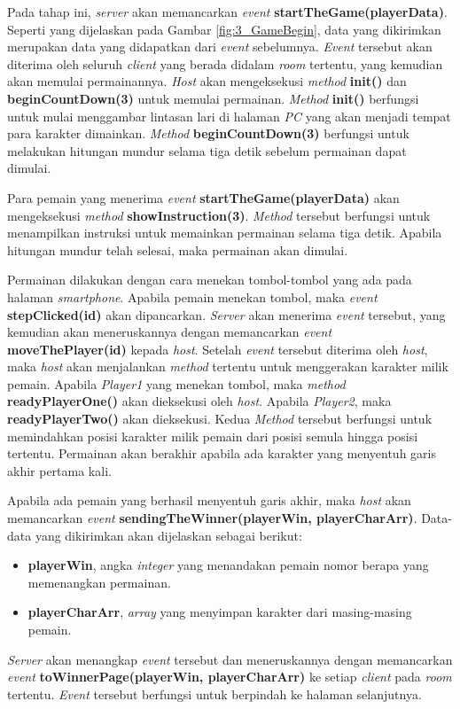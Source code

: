 Pada tahap ini, \textit{server} akan memancarkan \textit{event} \textbf{startTheGame(playerData)}. Seperti yang dijelaskan pada Gambar \ref{fig:3_GameBegin}, data yang dikirimkan merupakan data yang didapatkan dari \textit{event} sebelumnya. \textit{Event} tersebut akan diterima oleh seluruh \textit{client} yang berada didalam \textit{room} tertentu, yang kemudian akan memulai permainannya. \textit{Host} akan mengeksekusi \textit{method} \textbf{init()} dan \textbf{beginCountDown(3)} untuk memulai permainan. \textit{Method} \textbf{init()} berfungsi untuk mulai menggambar lintasan lari di halaman \textit{PC} yang akan menjadi tempat para karakter dimainkan. \textit{Method} \textbf{beginCountDown(3)} berfungsi untuk melakukan hitungan mundur selama tiga detik sebelum permainan dapat dimulai. 

Para pemain yang menerima \textit{event} \textbf{startTheGame(playerData)} akan mengeksekusi \textit{method} \textbf{showInstruction(3)}. \textit{Method} tersebut berfungsi untuk menampilkan instruksi untuk memainkan permainan selama tiga detik. Apabila hitungan mundur telah selesai, maka permainan akan dimulai.

Permainan dilakukan dengan cara menekan tombol-tombol yang ada pada halaman \textit{smartphone}. Apabila pemain menekan tombol, maka \textit{event} \textbf{stepClicked(id)} akan dipancarkan. \textit{Server} akan menerima \textit{event} tersebut, yang kemudian akan meneruskannya dengan memancarkan \textit{event} \textbf{moveThePlayer(id)} kepada \textit{host}. Setelah \textit{event} tersebut diterima oleh \textit{host}, maka \textit{host} akan menjalankan \textit{method} tertentu untuk menggerakan karakter milik pemain. Apabila \textit{Player1} yang menekan tombol, maka \textit{method} \textbf{readyPlayerOne()} akan dieksekusi oleh \textit{host}. Apabila \textit{Player2}, maka \textbf{readyPlayerTwo()} akan dieksekusi. Kedua \textit{Method} tersebut berfungsi untuk memindahkan posisi karakter milik pemain dari posisi semula hingga posisi tertentu. Permainan akan berakhir apabila ada karakter yang menyentuh garis akhir pertama kali.

Apabila ada pemain yang berhasil menyentuh garis akhir, maka \textit{host} akan memancarkan \textit{event} \textbf{sendingTheWinner(playerWin, playerCharArr)}. Data-data yang dikirimkan akan dijelaskan sebagai berikut:
\begin{itemize}
	\item \textbf{playerWin}, angka \textit{integer} yang menandakan pemain nomor berapa yang memenangkan permainan.
	\item \textbf{playerCharArr}, \textit{array} yang menyimpan karakter dari masing-masing pemain.
\end{itemize}
\textit{Server} akan menangkap \textit{event} tersebut dan meneruskannya dengan memancarkan \textit{event} \textbf{toWinnerPage(playerWin, playerCharArr)} ke setiap \textit{client} pada \textit{room} tertentu. \textit{Event} tersebut berfungsi untuk berpindah ke halaman selanjutnya.

